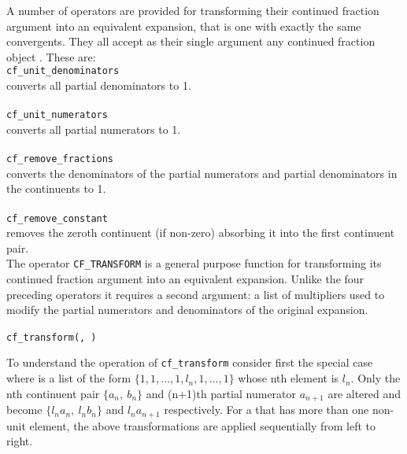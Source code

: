 \hypertarget{CF_UNIT_NUMERATORS:operator}{}
\hypertarget{CF_UNIT_DENOMINATORS:operator}{}
\hypertarget{CF_REMOVE_FRACTIONS:operator}{}
\hypertarget{CF_REMOVE_CONSTANT:operator}{}
A number of operators are provided for transforming their continued
fraction argument  into an equivalent expansion,
that is one with exactly the same convergents.
They all accept as their single argument any continued fraction
object .
These are:\\

\texttt{cf\_unit\_denominators}\\
converts all partial denominators to 1. \\\\
\texttt{cf\_unit\_numerators}\\
converts all partial numerators to 1. \\\\
\texttt{cf\_remove\_fractions}\\
converts the denominators of the partial numerators and partial
denominators in the continuents to 1.\\\\
\texttt{cf\_remove\_constant} \\
removes the zeroth continuent (if non-zero) absorbing it into the
first continuent pair.\\

\hypertarget{CF_TRANSFORM:operator}{}
The operator \texttt{CF\_TRANSFORM} is a general purpose function
for transforming its continued fraction argument  into
an equivalent expansion. Unlike the four preceding operators it requires
a second argument: a list of multipliers used to modify the partial
numerators and denominators of the original expansion.
\begin{syntaxtable}
  \texttt{cf\_transform(}\texttt{,}\,%
  \texttt{)}
\end{syntaxtable}
To understand the operation of \texttt{cf\_transform} consider first the
special case where  is a list of the
form $\{1, 1, \ldots, 1, l_n, 1, \ldots, 1\}$ whose nth element is $l_n$.
Only the nth continuent pair $\{a_n,\ b_n\}$ and (n+1)th partial numerator
$a_{n+1}$ are altered and become $\{l_na_n,\ l_nb_n\}$ and $l_na_{n+1}$
respectively. For a  that has more than one non-unit
element, the above transformations are applied sequentially from left to
right.


